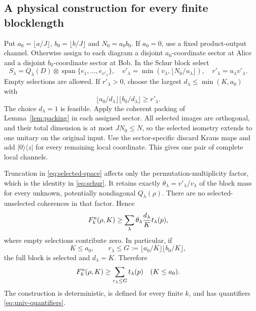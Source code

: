 \subsection{A physical construction for every finite blocklength}
Put $a_0=\lfloor a/J\rfloor$, $b_0=\lfloor b/J\rfloor$ and $N_0=a_0b_0$. If $a_0=0$, use a fixed product-output channel. Otherwise assign to each diagram a disjoint $a_0$-coordinate sector at Alice and a disjoint $b_0$-coordinate sector at Bob. In the Schur block select
\begin{equation}\label{eq:selected-space}
 S_\lambda=Q_\lambda(D)\otimes\operatorname{span}\{e_1,\ldots,e_{v'_\lambda}\},
 \quad v'_\lambda=\min(v_\lambda,\lfloor N_0/u_\lambda\rfloor),\quad
 r'_\lambda=u_\lambda v'_\lambda.
\end{equation}
Empty selections are allowed. If $r'_\lambda>0$, choose the largest $d_\lambda\le\min(K,a_0)$ with
\[
 \lfloor a_0/d_\lambda\rfloor\lfloor b_0/d_\lambda\rfloor\ge r'_\lambda.
\]
The choice $d_\lambda=1$ is feasible. Apply the coherent packing of Lemma~\ref{lem:packing} in each assigned sector. All selected images are orthogonal, and their total dimension is at most $JN_0\le N$, so the selected isometry extends to one unitary on the original input. Use the sector-specific discard Kraus maps and add $|0\rangle\langle z|$ for every remaining local coordinate. This gives one pair of complete local channels.

Truncation in \eqref{eq:selected-space} affects only the permutation-multiplicity factor, which is the identity in \eqref{eq:schur}. It retains exactly $\theta_\lambda=v'_\lambda/v_\lambda$ of the block mass for every unknown, potentially nondiagonal $Q_\lambda(\rho)$. There are no selected-unselected coherences in that factor. Hence
\begin{equation}\label{eq:univ-sum}
 F_k^{\rm u}(\rho,K)\ge\sum_\lambda\theta_\lambda\frac{d_\lambda}{K}t_\lambda(p),
\end{equation}
where empty selections contribute zero. In particular, if
\begin{equation}\label{eq:good-block}
 K\le a_0,\qquad r_\lambda\le G:=\lfloor a_0/K\rfloor\lfloor b_0/K\rfloor,
\end{equation}
the full block is selected and $d_\lambda=K$. Therefore
\begin{equation}\label{eq:good-mass}
 F_k^{\rm u}(\rho,K)\ge\sum_{r_\lambda\le G}t_\lambda(p)
 \quad(K\le a_0).
\end{equation}
The construction is deterministic, is defined for every finite $k$, and has quantifiers \eqref{eq:univ-quantifiers}.

